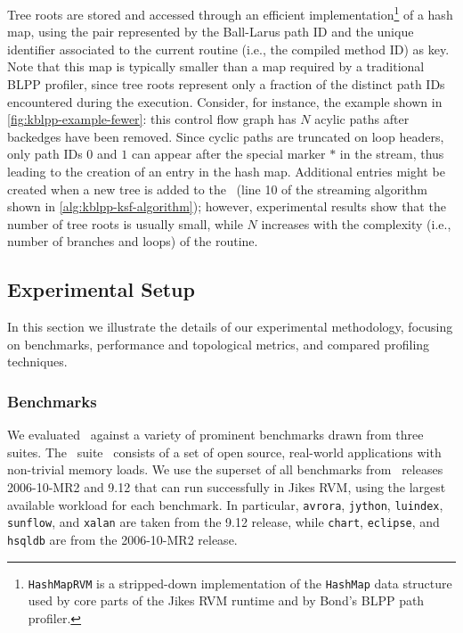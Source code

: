 \noindent Tree roots are stored and accessed through an efficient implementation\footnote{{\tt HashMapRVM} is a stripped-down implementation of the {\tt HashMap} data structure used by core parts of the Jikes RVM runtime and by Bond's BLPP path profiler.} of a hash map, using the pair represented by the Ball-Larus path ID and the unique identifier associated to the current routine (i.e., the compiled method ID) as key. Note that this map is typically smaller than a map required by a traditional BLPP profiler, since tree roots represent only a fraction of the distinct path IDs encountered during the execution. Consider, for instance, the example shown in \myfigure\ref{fig:kblpp-example-fewer}: this control flow graph has $N$ acylic paths after backedges have been removed. Since cyclic paths are truncated on loop headers, only path IDs $0$ and $1$ can appear after the special marker $*$ in the stream, thus leading to the creation of an entry in the hash map. Additional entries might be created when a new tree is added to the \ksf\ (line 10 of the streaming algorithm shown in \myalgorithm\ref{alg:kblpp-ksf-algorithm}); however, experimental results show that the number of tree roots is usually small, while $N$ increases with the complexity (i.e., number of branches and loops) of the routine.

\subsection{Experimental Setup}

In this section we illustrate the details of our experimental methodology, focusing on benchmarks, performance and topological metrics, and compared profiling techniques.

\subsubsection*{Benchmarks}

We evaluated \kblpp\ against a variety of prominent benchmarks drawn from three suites. The \dacapo\ suite~\cite{Blackburn06} consists of a set of open source, real-world applications with non-trivial memory loads. We use the superset of all benchmarks from \dacapo\ releases 2006-10-MR2 and 9.12 that can run successfully in Jikes RVM, using the largest available workload for each benchmark. In particular, {\tt avrora}, {\tt jython}, {\tt luindex}, {\tt sunflow}, and {\tt xalan} are taken from the 9.12 release, while {\tt chart}, {\tt eclipse}, and {\tt hsqldb} are from the 2006-10-MR2 release.

